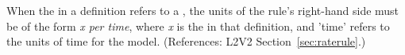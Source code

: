When the  in a \RateRule definition refers to a \Parameter,
the units of the rule's right-hand side must be of the form \emph{x per
time}, where \emph{x} is the  in that \Parameter definition,
and 'time' refers to the units of time for the model.  (References: L2V2
Section~\ref{sec:raterule}.)
